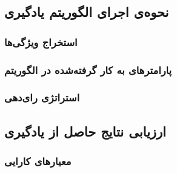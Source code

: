 	\subsection{نحوه‌ی اجرای الگوریتم یادگیری}
		
		\subsubsection{استخراج ویژگی‌ها}
		
		\subsubsection{پارامترهای به کار گرفته‌شده در الگوریتم}
		
		\subsubsection{استراتژی رای‌دهی}

	\subsection{ارزیابی نتایج حاصل از یادگیری}
	
		\subsubsection{معیارهای کارایی}

